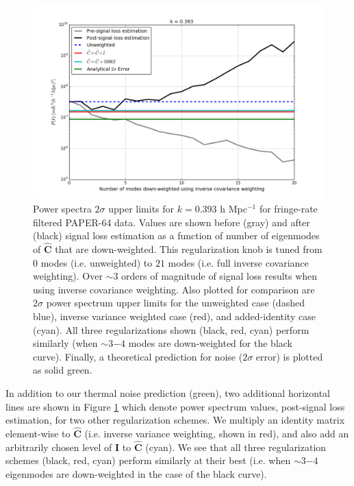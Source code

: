 \documentclass[preprint2,numberedappendix,tighten]{aastex6}  %
\begin{document}
\begin{figure}
	\centering
	\includegraphics[width=1\textwidth]{plots/sigloss_modeloop.png}
	\caption{Power spectra $2\sigma$ upper limits for $k=0.393$ h Mpc$^{-1}$ for fringe-rate filtered PAPER-64 data. Values 
are shown before (gray) and after (black) signal loss estimation as a function of number of eigenmodes of $\hat{\textbf{C}}$ that 
are down-weighted. This regularization knob is tuned from $0$ modes (i.e. unweighted) to $21$ modes (i.e. full inverse 
covariance weighting). Over $\sim3$ orders of magnitude of signal loss results when using inverse covariance weighting. Also 
plotted for comparison are $2\sigma$ power spectrum upper limits for the unweighted case (dashed blue), inverse variance 
weighted case (red), and added-identity case (cyan). All three regularizations shown (black, red, cyan) perform similarly (when 
$\sim3$$-4$ modes are down-weighted for the black curve). Finally, a theoretical prediction for noise ($2\sigma$ error) is plotted 
as solid green.}
	\label{fig:sigloss_modeloop}
\end{figure}

In addition to our thermal noise prediction (green), two additional horizontal lines are shown in Figure \ref{fig:sigloss_modeloop} 
which denote power spectrum values, post-signal loss estimation, for two other regularization schemes. We multiply an identity 
matrix element-wise to $\hat{\textbf{C}}$ (i.e. inverse variance weighting, shown in red), and also add an arbitrarily chosen level 
of $\textbf{I}$ to $\hat{\textbf{C}}$ (cyan). We see that all three regularization schemes (black, red, cyan) perform similarly at 
their best (i.e. when $\sim3$$-4$ eigenmodes are down-weighted in the case of the black curve).
\end{document}

